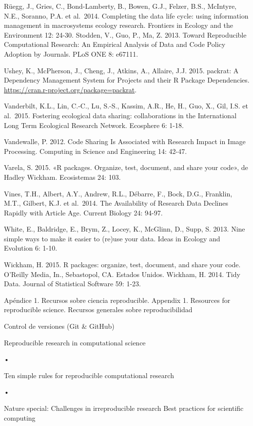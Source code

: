 \documentclass[]{tufte-handout}
\begin{document}
Rüegg, J., Gries, C., Bond-Lamberty, B., Bowen, G.J., Felzer, B.S.,
McIntyre, N.E., Soranno, P.A. et al.~2014. Completing the data life
cycle: using information management in macrosystems ecology research.
Frontiers in Ecology and the Environment 12: 24-30. Stodden, V., Guo,
P., Ma, Z. 2013. Toward Reproducible Computational Research: An
Empirical Analysis of Data and Code Policy Adoption by Journals. PLoS
ONE 8: e67111.

Ushey, K., McPherson, J., Cheng, J., Atkins, A., Allaire, J.J. 2015.
packrat: A Dependency Management System for Projects and their R Package
Dependencies. \url{https://cran.r-project.org/package=packrat}.

Vanderbilt, K.L., Lin, C.-C., Lu, S.-S., Kassim, A.R., He, H., Guo, X.,
Gil, I.S. et al.~2015. Fostering ecological data sharing: collaborations
in the International Long Term Ecological Research Network. Ecosphere 6:
1-18.

Vandewalle, P. 2012. Code Sharing Is Associated with Research Impact in
Image Processing. Computing in Science and Engineering 14: 42-47.

Varela, S. 2015. «R packages. Organize, test, document, and share your
code», de Hadley Wickham. Ecosistemas 24: 103.

Vines, T.H., Albert, A.Y., Andrew, R.L., Débarre, F., Bock, D.G.,
Franklin, M.T., Gilbert, K.J. et al.~2014. The Availability of Research
Data Declines Rapidly with Article Age. Current Biology 24: 94-97.

White, E., Baldridge, E., Brym, Z., Locey, K., McGlinn, D., Supp, S.
2013. Nine simple ways to make it easier to (re)use your data. Ideas in
Ecology and Evolution 6: 1-10.

Wickham, H. 2015. R packages: organize, test, document, and share your
code. O'Reilly Media, In., Sebastopol, CA. Estados Unidos. Wickham, H.
2014. Tidy Data. Journal of Statistical Software 59: 1-23.

Apéndice 1. Recursos sobre ciencia reproducible. Appendix 1. Resources
for reproducible science. Recursos generales sobre reproducibilidad

Control de versiones (Git \& GitHub)

Reproducible research in computational science

•

Ten simple rules for reproducible computational research

•

Nature special: Challenges in irreproducible research Best practices for
scientific computing
\end{document}
